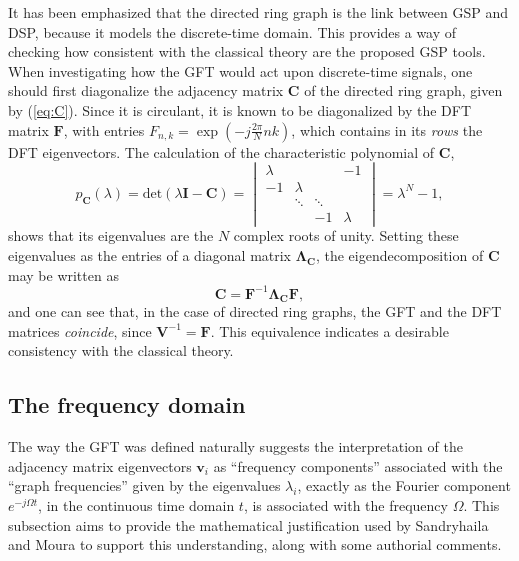 It has been emphasized that the directed ring graph is the link between GSP and DSP, because it models the discrete-time domain. This provides a way of checking how consistent with the classical theory are the proposed GSP tools. When investigating how the GFT would act upon discrete-time signals, one should first diagonalize the adjacency matrix $ \mathbf{C} $ of the directed ring graph, given by (\ref{eq:C}). Since it is circulant, it is known to be diagonalized by the DFT matrix $ \mathbf{F} $, with entries $ F_{n,k} = \exp \left( -j\frac{2 \pi}{N} nk \right) $, which contains in its \emph{rows} the DFT eigenvectors. The calculation of the characteristic polynomial of $ \mathbf{C} $,
\begin{equation}
p_{\mathbf{C}}(\lambda) = \text{det} (\lambda \mathbf{I} - \mathbf{C}) =
\begin{vmatrix}
\lambda &  &  &   -1\\ 
-1 & \lambda &   & \\ 
&   \ddots & \ddots & \\ 
&  &   -1 & \lambda
\end{vmatrix}
=\lambda^N - 1,
\end{equation}
shows that its eigenvalues are the $ N $ complex roots of unity. Setting these eigenvalues as the entries of a diagonal matrix $ \mathbf{\Lambda}_{\mathbf{C}} $, the eigendecomposition of $ \mathbf{C} $ may be written as
\begin{equation}\label{eq:diag_C}
\mathbf{C} = \mathbf{F}^{-1} \mathbf{\Lambda}_{\mathbf{C}} \mathbf{F},
\end{equation}
and one can see that, in the case of directed ring graphs, the GFT and the DFT matrices \emph{coincide}, since $ \mathbf{V}^{-1} = \mathbf{F} $. This equivalence indicates a desirable consistency with the classical theory.

 \subsection{The frequency domain}

The way the GFT was defined naturally suggests the interpretation of the adjacency matrix eigenvectors $ \mathbf{v}_i $ as ``frequency components'' associated with the ``graph frequencies'' given by the eigenvalues $ \lambda_i $, exactly as the Fourier component $ e^{-j \Omega t} $, in the continuous time domain $ t $, is associated with the frequency $ \Omega $. This subsection aims to provide the mathematical justification used by Sandryhaila and Moura \cite{sandryhaila2014frequency} to support this understanding, along with some authorial comments.

